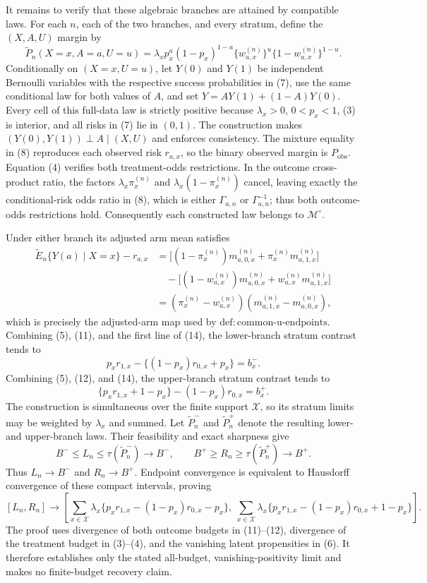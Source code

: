It remains to verify that these algebraic branches are attained by compatible laws.  For each \(n\), each of the two branches, and every stratum, define the \((X,A,U)\) margin by
\[
 \widetilde P_n(X=x,A=a,U=u)
 =\lambda_xp_x^a(1-p_x)^{1-a}
  \{w_{a,x}^{(n)}\}^{u}\{1-w_{a,x}^{(n)}\}^{1-u}.
 \tag{13}
\]
Conditionally on \((X=x,U=u)\), let \(Y(0)\) and \(Y(1)\) be independent Bernoulli variables with the respective success probabilities in (7), use the same conditional law for both values of \(A\), and set \(Y=AY(1)+(1-A)Y(0)\).  Every cell of this full-data law is strictly positive because \(\lambda_x>0\), \(0<p_x<1\), (3) is interior, and all risks in (7) lie in \((0,1)\).  The construction makes \((Y(0),Y(1))\perp A\mid(X,U)\) and enforces consistency.  The mixture equality in (8) reproduces each observed risk \(r_{a,x}\), so the binary observed margin is \(P_{\mathrm{obs}}\).  Equation (4) verifies both treatment-odds restrictions.  In the outcome cross-product ratio, the factors \(\lambda_x\pi_x^{(n)}\) and \(\lambda_x(1-\pi_x^{(n)})\) cancel, leaving exactly the conditional-risk odds ratio in (8), which is either \(\Gamma_{a,n}\) or \(\Gamma_{a,n}^{-1}\); thus both outcome-odds restrictions hold.  Consequently each constructed law belongs to \(\mathcal M^{\circ}\).

Under either branch its adjusted arm mean satisfies
\[
\begin{aligned}
 \widetilde E_n\{Y(a)\mid X=x\}-r_{a,x}
 &=\bigl[(1-\pi_x^{(n)})m_{a,0,x}^{(n)}
          +\pi_x^{(n)}m_{a,1,x}^{(n)}\bigr]\\
 &\quad-\bigl[(1-w_{a,x}^{(n)})m_{a,0,x}^{(n)}
          +w_{a,x}^{(n)}m_{a,1,x}^{(n)}\bigr]\\
 &=(\pi_x^{(n)}-w_{a,x}^{(n)})
   (m_{a,1,x}^{(n)}-m_{a,0,x}^{(n)}),
\end{aligned}
\tag{14}
\]
which is precisely the adjusted-arm map used by \(\mathrm{def{:}common\text{-}u\text{-}endpoints}\).  Combining (5), (11), and the first line of (14), the lower-branch stratum contrast tends to
\[
 p_xr_{1,x}-\{(1-p_x)r_{0,x}+p_x\}=b_x^-.
 \tag{15}
\]
Combining (5), (12), and (14), the upper-branch stratum contrast tends to
\[
 \{p_xr_{1,x}+1-p_x\}-(1-p_x)r_{0,x}=b_x^+.
 \tag{16}
\]
The construction is simultaneous over the finite support \(\mathcal X\), so its stratum limits may be weighted by \(\lambda_x\) and summed.  Let \(\widetilde P_n^-\) and \(\widetilde P_n^+\) denote the resulting lower- and upper-branch laws.  Their feasibility and exact sharpness give
\[
 B^-\leq L_n\leq\tau(\widetilde P_n^- )\longrightarrow B^-,
 \qquad
 B^+\geq R_n\geq\tau(\widetilde P_n^+ )\longrightarrow B^+.
\]
Thus \(L_n\to B^-\) and \(R_n\to B^+\).  Endpoint convergence is equivalent to Hausdorff convergence of these compact intervals, proving
\[
 [L_n,R_n]\longrightarrow
 \left[
 \sum_{x\in\mathcal X}\lambda_x\{p_xr_{1,x}-(1-p_x)r_{0,x}-p_x\},
 \ \sum_{x\in\mathcal X}\lambda_x\{p_xr_{1,x}-(1-p_x)r_{0,x}+1-p_x\}
 \right].
\]
The proof uses divergence of both outcome budgets in (11)--(12), divergence of the treatment budget in (3)--(4), and the vanishing latent propensities in (6).  It therefore establishes only the stated all-budget, vanishing-positivity limit and makes no finite-budget recovery claim.
